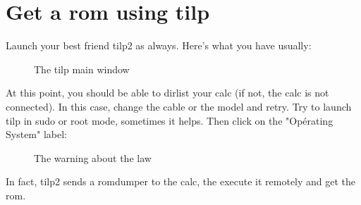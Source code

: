 \documentclass[10pt]{report}
\begin{document}
\section{Get a rom using tilp}
Launch your best friend tilp2 as always.\newline\newline
Here's what you have usually:\newline
\begin{figure}[H]
\centering
{}
\caption{The tilp main window}
\end{figure}

At this point, you should be able to dirlist your calc (if not, the calc is not connected).\newline
In this case, change the cable or the model and retry.\newline
Try to launch tilp in sudo or root mode, sometimes it helps.\newline\newline
Then click on the "Opérating System" label:\newline 
\begin{figure}[H]
\centering
{}
\caption{The warning about the law}
\end{figure}

In fact, tilp2 sends a romdumper to the calc, the execute it remotely and get the rom.\newline
\end{document}
